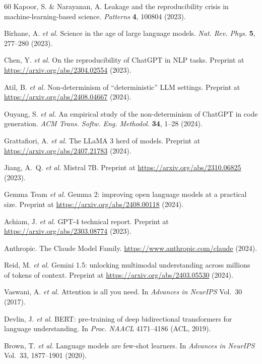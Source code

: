 \documentclass[sn-nature]{sn-jnl}
\begin{document}
\begin{thebibliography}{60}
Kapoor, S. \& Narayanan, A.
Leakage and the reproducibility crisis in machine-learning-based science.
\emph{Patterns} \textbf{4}, 100804 (2023).

Birhane, A. \emph{et al.}
Science in the age of large language models.
\emph{Nat. Rev. Phys.} \textbf{5}, 277--280 (2023).

Chen, Y. \emph{et al.}
On the reproducibility of ChatGPT in NLP tasks.
Preprint at \url{https://arxiv.org/abs/2304.02554} (2023).

Atil, B. \emph{et al.}
Non-determinism of ``deterministic'' LLM settings.
Preprint at \url{https://arxiv.org/abs/2408.04667} (2024).

Ouyang, S. \emph{et al.}
An empirical study of the non-determinism of ChatGPT in code generation.
\emph{ACM Trans. Softw. Eng. Methodol.} \textbf{34}, 1--28 (2024).

Grattafiori, A. \emph{et al.}
The LLaMA 3 herd of models.
Preprint at \url{https://arxiv.org/abs/2407.21783} (2024).

Jiang, A.~Q. \emph{et al.}
Mistral 7B.
Preprint at \url{https://arxiv.org/abs/2310.06825} (2023).

Gemma Team \emph{et al.}
Gemma 2: improving open language models at a practical size.
Preprint at \url{https://arxiv.org/abs/2408.00118} (2024).

Achiam, J. \emph{et al.}
GPT-4 technical report.
Preprint at \url{https://arxiv.org/abs/2303.08774} (2023).

Anthropic.
The Claude Model Family.
\url{https://www.anthropic.com/claude} (2024).

Reid, M. \emph{et al.}
Gemini 1.5: unlocking multimodal understanding across millions of tokens of context.
Preprint at \url{https://arxiv.org/abs/2403.05530} (2024).

Vaswani, A. \emph{et al.}
Attention is all you need.
In \emph{Advances in NeurIPS} Vol.~30 (2017).

Devlin, J. \emph{et al.}
BERT: pre-training of deep bidirectional transformers for language understanding.
In \emph{Proc. NAACL} 4171--4186 (ACL, 2019).

Brown, T. \emph{et al.}
Language models are few-shot learners.
In \emph{Advances in NeurIPS} Vol.~33, 1877--1901 (2020).


\end{thebibliography}
\end{document}
